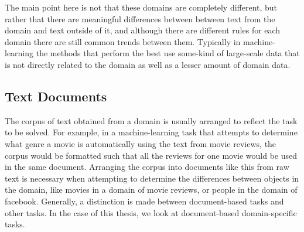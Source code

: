 The main point here is not that these domains are completely different, but rather that there are meaningful differences between between text from the domain and text outside of it, and although there are different rules for each domain there are still common trends between them. Typically in machine-learning the methods that perform the best use some-kind of large-scale data that is not directly related to the domain as well as a lesser amount of domain data.






















\subsection{Text Documents}


The corpus of text obtained from a domain is usually arranged to reflect the task to be solved. For example, in a machine-learning task that attempts to determine what genre a movie is automatically using the text from movie reviews, the corpus would be formatted such that all the reviews for one movie would be used in the same document. Arranging the corpus into documents like this from raw text is necessary when attempting to determine the differences between objects in the domain, like movies in a domain of movie reviews, or people in the domain of facebook. Generally, a distinction is made between document-based tasks and other tasks. In the case of this thesis, we look at document-based domain-specific tasks.

